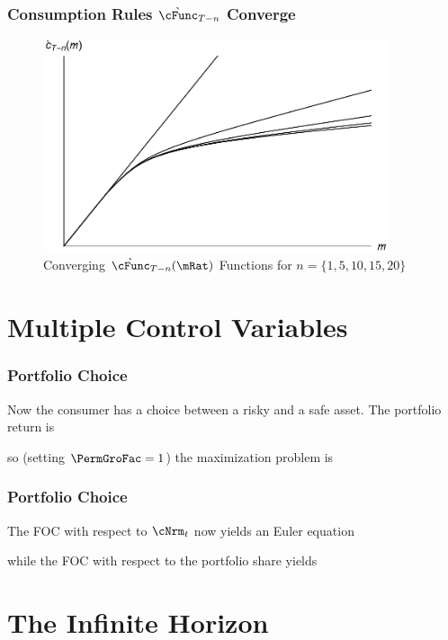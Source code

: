 \documentclass{beamer}
\begin{document}
\begin{frame}%
\frametitle{Consumption Rules $\grave{\cFunc}_{T-n}$ Converge}

\begin{figure}
        \includegraphics[width=4in]{./Figures/PlotCFuncsConverge.pdf}
        \caption{Converging $\grave{\cFunc}_{T-n}({\mRat})$ Functions for $n=\{1,5,10,15,20\}$}
        \label{fig:PlotCFuncsConverge}
\end{figure}

\end{frame}


\section{Multiple Control Variables}
\begin{frame}
\frametitle{Portfolio Choice}

Now the consumer has a choice between a risky and a safe asset.  \pause The portfolio
return is

\pause so (setting $\PermGroFac=1$) the maximization problem is \pause 


\end{frame}

\begin{frame}
\frametitle{Portfolio Choice}

The FOC with respect to $\cNrm_{t}$ now yields an Euler equation

\pause
while the FOC with respect to the portfolio share yields


\end{frame}

\section{The Infinite Horizon}
\end{document}
